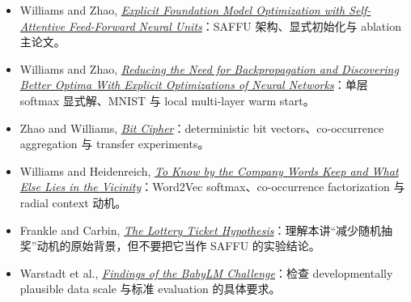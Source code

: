 \documentclass[a4paper]{article}
\begin{document}
\begingroup
\small
\setlength{\itemsep}{2pt}
\begin{itemize}
  \item Williams and Zhao, \href{https://arxiv.org/abs/2311.07510}{\emph{Explicit Foundation Model Optimization with Self-Attentive Feed-Forward Neural Units}}：SAFFU 架构、显式初始化与 ablation 主论文。
  \item Williams and Zhao, \href{https://arxiv.org/abs/2311.07498}{\emph{Reducing the Need for Backpropagation and Discovering Better Optima With Explicit Optimizations of Neural Networks}}：单层 softmax 显式解、MNIST 与 local multi-layer warm start。
  \item Zhao and Williams, \href{https://arxiv.org/abs/2311.11012}{\emph{Bit Cipher}}：deterministic bit vectors、co-occurrence aggregation 与 transfer experiments。
  \item Williams and Heidenreich, \href{https://arxiv.org/abs/2205.00148}{\emph{To Know by the Company Words Keep and What Else Lies in the Vicinity}}：Word2Vec softmax、co-occurrence factorization 与 radial context 动机。
  \item Frankle and Carbin, \href{https://arxiv.org/abs/1803.03635}{\emph{The Lottery Ticket Hypothesis}}：理解本讲“减少随机抽奖”动机的原始背景，但不要把它当作 SAFFU 的实验结论。
  \item Warstadt et al., \href{https://arxiv.org/abs/2310.00915}{\emph{Findings of the BabyLM Challenge}}：检查 developmentally plausible data scale 与标准 evaluation 的具体要求。
\end{itemize}
\endgroup
\end{document}
